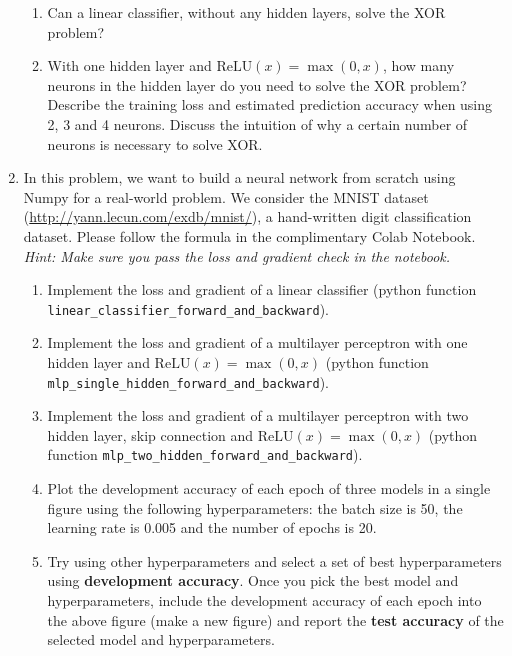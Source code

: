 \documentclass[a4paper]{article}
\begin{document}
\begin{enumerate}
\begin{enumerate}
\item Can a linear classifier, without any hidden layers, solve the XOR problem?
\item With one hidden layer and $\textrm{ReLU}(x) = \max(0, x)$, how many neurons in the hidden layer do you need to solve the XOR problem? Describe the training loss and estimated prediction accuracy when using 2, 3 and 4 neurons. Discuss the intuition of why a certain number of neurons is necessary to solve XOR.
\end{enumerate}{}

\item
In this problem, we want to build a neural network from scratch using Numpy for a real-world problem. We consider the MNIST dataset (\url{http://yann.lecun.com/exdb/mnist/}), a hand-written digit classification dataset. Please follow the formula in the complimentary Colab Notebook. \textit{Hint: Make sure you pass the loss and gradient check in the notebook.}
\begin{enumerate}
\item Implement the loss and gradient of a linear classifier (python function \\
\texttt{linear\_classifier\_forward\_and\_backward}).
\item Implement the loss and gradient of a multilayer perceptron with one hidden layer and $\textrm{ReLU}(x) = \max(0, x)$ (python function \texttt{mlp\_single\_hidden\_forward\_and\_backward}).
\item Implement the loss and gradient of a multilayer perceptron with two hidden layer, skip connection and $\textrm{ReLU}(x) = \max(0, x)$ (python function \texttt{mlp\_two\_hidden\_forward\_and\_backward}).
\item Plot the development accuracy of each epoch of three models in a single figure using the following hyperparameters: the batch size is 50, the learning rate is 0.005 and the number of epochs is 20.
\item Try using other hyperparameters and select a set of best hyperparameters using \textbf{development accuracy}. Once you pick the best model and hyperparameters, include the development accuracy of each epoch into the above figure (make a new figure) and report the \textbf{test accuracy} of the selected model and hyperparameters.
\end{enumerate}

\end{enumerate}
\end{document}
